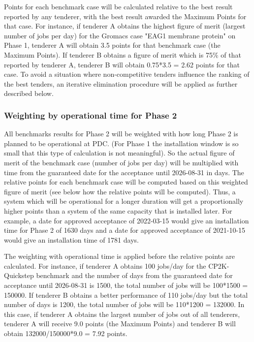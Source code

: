 \documentclass{article}
\begin{document}
Points for each benchmark case will be calculated relative to the best result reported by any tenderer, with the best result awarded the Maximum Points for that case. For instance, if tenderer A obtains the highest figure of merit (largest number of jobs per day) for the Gromacs case "EAG1 membrane protein" on Phase 1, tenderer A will obtain 3.5 points for that benchmark case (the Maximum Points). If tenderer B obtains a figure of merit which is 75\% of that reported by tenderer A, tenderer B will obtain 0.75*3.5 = 2.62 points for that case. To avoid a situation where non-competitive tenders influence the ranking of the best tenders, an iterative elimination procedure will be applied as further described below.

\subsubsection*{Weighting by operational time for Phase 2}

All benchmarks results for Phase 2 will be weighted with how long Phase 2 is planned to be operational at PDC. (For Phase 1 the
installation window is so small that this type of calculation is not meaningful). So the actual figure of merit of the benchmark case (number of jobs per day) will be multiplied with time from the guaranteed date for the acceptance until 2026-08-31 in days. The relative points for each benchmark case will be computed based on this weighted figure of merit (see below how the relative points will be computed). Thus, a system which will be operational for a longer duration will get a proportionally higher points than a system of the same capacity that is installed later. For example, a date for approved acceptance of 2022-03-15 would give an installation time for Phase 2 of 1630 days and a date for approved acceptance of 2021-10-15 would give an installation time of 1781 days.

The weighting with operational time is applied before the relative
points are calculated. For instance, if tenderer A obtains 100 jobs/day for the CP2K-Quickstep benchmark and the number of days from the guaranteed date for acceptance until 2026-08-31 is 1500, the total number of jobs will be 100*1500 = 150000. If tenderer B obtains a better performance of 110 jobs/day but the total number of days is
1200, the total number of jobs will be 110*1200 = 132000. In this
case, if tenderer A obtains the largest number of jobs out of all
tenderers, tenderer A will receive 9.0 points (the Maximum Points) and tenderer B will obtain 132000/150000*9.0 = 7.92 points.
\end{document}
